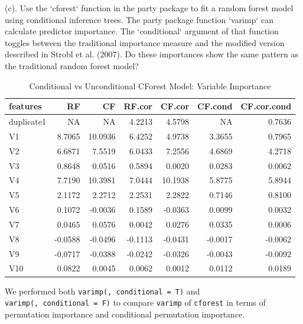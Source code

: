 \documentclass[]{report}
\begin{document}
\begin{subquestion}{(c).} Use the `cforest` function in the party package to fit a random forest model using conditional inference trees. The party package function `varimp` can calculate predictor importance. The `conditional` argument of that function toggles between the traditional importance measure and the modified version described in Strobl et al. (2007). Do these importances show the same pattern as the traditional random forest model?\end{subquestion}

\begin{table}[H]

\caption{\label{tab:unnamed-chunk-1}Conditional vs Unconditional CForest Model: Variable Importance}
\centering
\fontsize{8}{10}\selectfont
\begin{tabular}[t]{l|r|r|r|r|r|r}
\hline
\textbf{features} & \textbf{RF} & \textbf{CF} & \textbf{RF.cor} & \textbf{CF.cor} & \textbf{CF.cond} & \textbf{CF.cor.cond}\\
\hline
\rowcolor{gray!6}  duplicate1 & NA & NA & 4.2213 & 4.5798 & NA & 0.7636\\
\hline
V1 & 8.7065 & 10.0936 & 6.4252 & 4.9738 & 3.3655 & 0.7965\\
\hline
\rowcolor{gray!6}  V2 & 6.6871 & 7.5519 & 6.0433 & 7.2556 & 4.6869 & 4.2718\\
\hline
V3 & 0.8648 & 0.0516 & 0.5894 & 0.0020 & 0.0283 & 0.0062\\
\hline
\rowcolor{gray!6}  V4 & 7.7190 & 10.3981 & 7.0444 & 10.1938 & 5.8775 & 5.8944\\
\hline
V5 & 2.1172 & 2.2712 & 2.2531 & 2.2822 & 0.7146 & 0.8100\\
\hline
\rowcolor{gray!6}  V6 & 0.1072 & -0.0036 & 0.1589 & -0.0363 & 0.0099 & 0.0032\\
\hline
V7 & 0.0465 & 0.0576 & 0.0042 & 0.0276 & 0.0335 & 0.0006\\
\hline
\rowcolor{gray!6}  V8 & -0.0588 & -0.0496 & -0.1113 & -0.0431 & -0.0017 & -0.0062\\
\hline
V9 & -0.0717 & -0.0388 & -0.0242 & -0.0326 & -0.0043 & -0.0092\\
\hline
\rowcolor{gray!6}  V10 & 0.0822 & 0.0045 & 0.0062 & 0.0012 & 0.0112 & 0.0189\\
\hline
\end{tabular}
\end{table}

We performed both \texttt{varimp(,\ conditional\ =\ T)} and
\texttt{varimp(,\ conditional\ =\ F)} to compare \texttt{varimp} of
\texttt{cforest} in terms of permutation importance and conditional
permutation importance.
\end{document}
